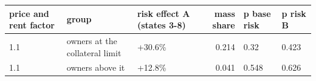 \begingroup\small
\setlength{\tabcolsep}{3pt}
\renewcommand{\arraystretch}{1.04}
\begin{tabularx}{\linewidth}{XXXrXX}
\toprule
price and rent factor & group & risk effect A (states 3-8) & mass share & p base risk & p risk B \\
\midrule
1.1 & owners at the collateral limit & +30.6\% & 0.214 & 0.32 & 0.423 \\
1.1 & owners above it & +12.8\% & 0.041 & 0.548 & 0.626 \\
\bottomrule
\end{tabularx}
\endgroup
